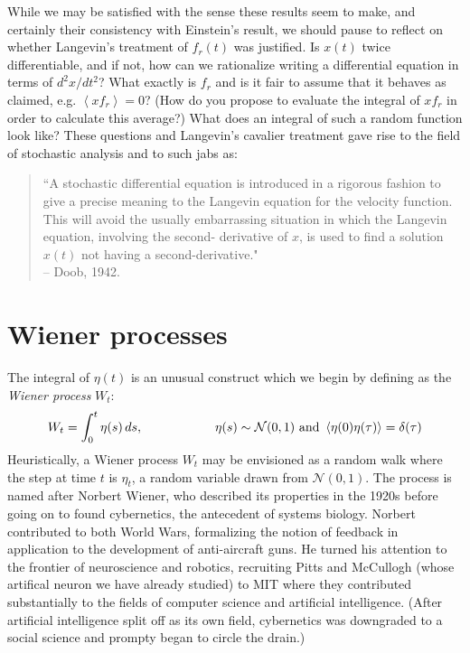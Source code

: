 \documentclass{article}
\begin{document}
While we may be satisfied with the sense these results seem to make, and certainly their consistency with Einstein's result, we should pause to reflect on whether Langevin's treatment of $f_r(t)$ was justified. Is $x(t)$ twice differentiable, and if not, how can we rationalize writing a differential equation in terms of $d^2x/dt^2$? What exactly is $f_r$ and is it fair to assume that it behaves as claimed, e.g. $\left< x f_r \right>=0$? (How do you propose to evaluate the integral of $xf_r$ in order to calculate this average?) What does an integral of such a random function look like? These questions and Langevin's cavalier treatment gave rise to the field of stochastic analysis and to such jabs as:

\begin{quote}
``A stochastic differential equation is introduced in a rigorous fashion to give a precise meaning to the Langevin equation for the velocity function. This will avoid the usually embarrassing situation in which the Langevin equation, involving the second- derivative of $x$, is used to find a solution $x(t)$ not having a second-derivative."\\
-- Doob, 1942.
\end{quote}

\section*{Wiener processes}

The integral of $\eta(t)$ is an unusual construct which we begin by defining as the \textit{Wiener process} $W_t$:
\[ W_t = \int_0^t \eta(s) \, ds, \hspace{2 cm} \eta(s) \sim \mathcal{N}(0,1) \textrm{ and } \left< \eta(0) \eta(\tau) \right> = \delta(\tau) \]
Heuristically, a Wiener process $W_t$ may be envisioned as a random walk where the step at time $t$ is $\eta_t$, a random variable drawn from $\mathcal{N}(0,1)$. The process is named after Norbert Wiener, who described its properties in the 1920s before going on to found cybernetics, the antecedent of systems biology. Norbert contributed to both World Wars, formalizing the notion of feedback in application to the development of anti-aircraft guns. He turned his attention to the frontier of neuroscience and robotics, recruiting Pitts and McCullogh (whose artifical neuron we have already studied) to MIT where they contributed substantially to the fields of computer science and artificial intelligence. (After artificial intelligence split off as its own field, cybernetics was downgraded to a social science and prompty began to circle the drain.)\\
\end{document}
